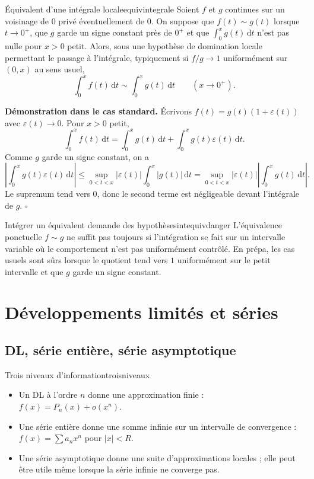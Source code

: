 \documentclass[11pt,a4paper]{article}
\newcommand{\dd}{\mathrm{d}}
\newcommand{\eps}{\varepsilon}
\begin{document}
\begin{propositionbox}{Équivalent d'une intégrale locale}{equivintegrale}
Soient $f$ et $g$ continues sur un voisinage de $0$ privé éventuellement de $0$. On suppose que $f(t)\sim g(t)$ lorsque $t\to0^+$, que $g$ garde un signe constant près de $0^+$ et que $\int_0^x g(t)\,\dd t$ n'est pas nulle pour $x>0$ petit. Alors, sous une hypothèse de domination locale permettant le passage à l'intégrale, typiquement si $f/g\to1$ uniformément sur $(0,x)$ au sens usuel,
\[
  \int_0^x f(t)\,\dd t\sim \int_0^x g(t)\,\dd t\qquad(x\to0^+).
\]
\end{propositionbox}

\textbf{Démonstration dans le cas standard.} Écrivons $f(t)=g(t)(1+\eps(t))$ avec $\eps(t)\to0$. Pour $x>0$ petit,
\[
  \int_0^x f(t)\,\dd t=\int_0^x g(t)\,\dd t+\int_0^x g(t)\eps(t)\,\dd t.
\]
Comme $g$ garde un signe constant, on a
\[
\left|\int_0^x g(t)\eps(t)\,\dd t\right|
\le \sup_{0<t<x}|\eps(t)|\int_0^x |g(t)|\,\dd t
=\sup_{0<t<x}|\eps(t)|\left|\int_0^x g(t)\,\dd t\right|.
\]
Le supremum tend vers $0$, donc le second terme est négligeable devant l'intégrale de $g$.
\hfill $\square$

\begin{warningbox}{Intégrer un équivalent demande des hypothèses}{intequivdanger}
L'équivalence ponctuelle $f\sim g$ ne suffit pas toujours si l'intégration se fait sur un intervalle variable où le comportement n'est pas uniformément contrôlé. En prépa, les cas usuels sont sûrs lorsque le quotient tend vers $1$ uniformément sur le petit intervalle et que $g$ garde un signe constant.
\end{warningbox}

\section{Développements limités et séries}

\subsection{DL, série entière, série asymptotique}

\begin{definitionbox}{Trois niveaux d'information}{troisniveaux}
\begin{itemize}[label=$\triangleright$]
\item Un DL à l'ordre $n$ donne une approximation finie : $f(x)=P_n(x)+o(x^n)$.
\item Une série entière donne une somme infinie sur un intervalle de convergence : $f(x)=\sum a_nx^n$ pour $|x|<R$.
\item Une série asymptotique donne une suite d'approximations locales ; elle peut être utile même lorsque la série infinie ne converge pas.
\end{itemize}
\end{definitionbox}
\end{document}
